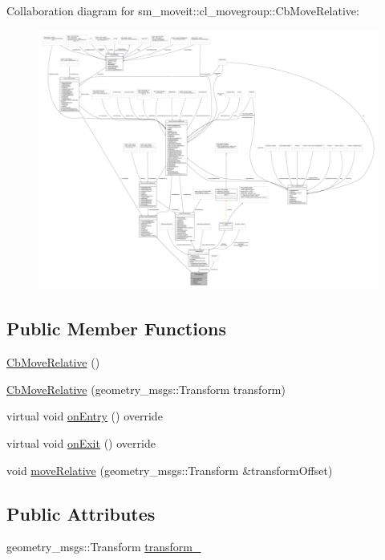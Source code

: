 Collaboration diagram for sm\+\_\+moveit\+:\+:cl\+\_\+movegroup\+:\+:Cb\+Move\+Relative\+:
\nopagebreak
\begin{figure}[H]
\begin{center}
\leavevmode
\includegraphics[width=350pt]{classsm__moveit_1_1cl__movegroup_1_1CbMoveRelative__coll__graph}
\end{center}
\end{figure}
\subsection*{Public Member Functions}
\begin{DoxyCompactItemize}
\item 
\hyperlink{classsm__moveit_1_1cl__movegroup_1_1CbMoveRelative_a224327b6bf03425fc574c15d1ce50591}{Cb\+Move\+Relative} ()
\item 
\hyperlink{classsm__moveit_1_1cl__movegroup_1_1CbMoveRelative_ae1b020e695d2e12d80ebaed2d0b5fa24}{Cb\+Move\+Relative} (geometry\+\_\+msgs\+::\+Transform transform)
\item 
virtual void \hyperlink{classsm__moveit_1_1cl__movegroup_1_1CbMoveRelative_ab74346c47eaeba74161faefe33c0f2cd}{on\+Entry} () override
\item 
virtual void \hyperlink{classsm__moveit_1_1cl__movegroup_1_1CbMoveRelative_aa4dbb9662f31442fba4405aad7d46924}{on\+Exit} () override
\item 
void \hyperlink{classsm__moveit_1_1cl__movegroup_1_1CbMoveRelative_ac5ca4111cb8b617ca02b345d28f5c6a6}{move\+Relative} (geometry\+\_\+msgs\+::\+Transform \&transform\+Offset)
\end{DoxyCompactItemize}
\subsection*{Public Attributes}
\begin{DoxyCompactItemize}
\item 
geometry\+\_\+msgs\+::\+Transform \hyperlink{classsm__moveit_1_1cl__movegroup_1_1CbMoveRelative_ac0f70c737faaaeb5e63aa2a4f727d30e}{transform\+\_\+}
\end{DoxyCompactItemize}
